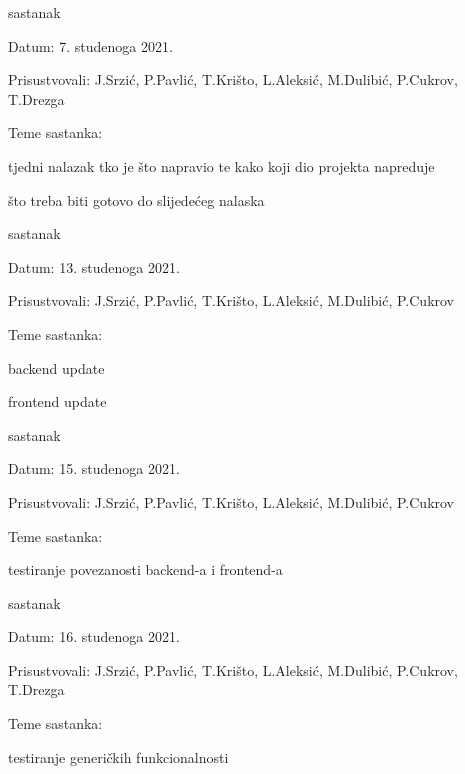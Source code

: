 \begin{packed_enum}
			\item  sastanak
			\item[] \begin{packed_item}
				\item Datum: 7. studenoga 2021.
				\item Prisustvovali: J.Srzić, P.Pavlić, T.Krišto, L.Aleksić, M.Dulibić, P.Cukrov, T.Drezga
				\item Teme sastanka:
				\begin{packed_item}
					\item  tjedni nalazak tko je što napravio te kako koji dio projekta napreduje
					\item  što treba biti gotovo do slijedećeg nalaska 
				\end{packed_item}
			\end{packed_item}
			
			\item  sastanak
			\item[] \begin{packed_item}
				\item Datum: 13. studenoga 2021.
				\item Prisustvovali: J.Srzić, P.Pavlić, T.Krišto, L.Aleksić, M.Dulibić, P.Cukrov
				\item Teme sastanka:
				\begin{packed_item}
					\item  backend update
					\item  frontend update
				\end{packed_item}
			\end{packed_item}
			
			\item  sastanak
			\item[] \begin{packed_item}
				\item Datum: 15. studenoga 2021.
				\item Prisustvovali: J.Srzić, P.Pavlić, T.Krišto, L.Aleksić, M.Dulibić, P.Cukrov
				\item Teme sastanka:
				\begin{packed_item}
					\item  testiranje povezanosti backend-a i frontend-a
				\end{packed_item}
			\end{packed_item}
			
			\item  sastanak
			\item[] \begin{packed_item}
				\item Datum: 16. studenoga 2021.
				\item Prisustvovali: J.Srzić, P.Pavlić, T.Krišto, L.Aleksić, M.Dulibić, P.Cukrov, T.Drezga
				\item Teme sastanka:
				\begin{packed_item}
					\item  testiranje generičkih funkcionalnosti
				\end{packed_item}
			\end{packed_item}
		

\end{packed_enum}
